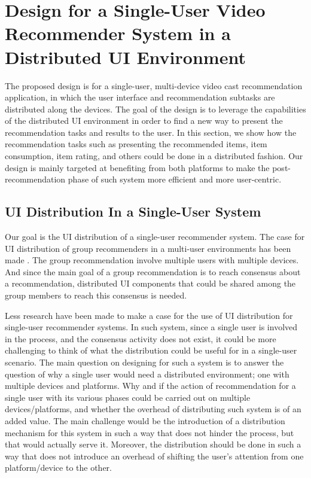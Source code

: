 \section{Design for a Single-User Video Recommender System in a Distributed UI Environment}
The proposed design is for a single-user, multi-device video cast recommendation application, in which the user interface and recommendation subtasks are distributed along the devices. The goal of the design is to leverage the capabilities of the distributed UI environment in order to find a new way to present the recommendation tasks and results to the user. In this section, we show how the recommendation tasks such as presenting the recommended items, item consumption, item rating, and others could be done in a distributed fashion. Our design is mainly targeted at benefiting from both platforms to make the post-recommendation phase of such system more efficient and more user-centric.

\subsection{UI Distribution In a Single-User System}
Our goal is the UI distribution of a single-user recommender system. The case
for UI distribution of group recommenders in a multi-user environments has been
made \cite{worndlvoting}. The group recommendation involve multiple users with
multiple devices.
And since the main goal of a group recommendation is to reach consensus about a recommendation, distributed UI components that could be shared among the group members to reach this consensus is needed.

Less research have been made to make a case for the use of UI distribution for
single-user recommender systems. In such system, since a single user is involved
in the process, and the consensus activity does not exist, it could be more
challenging to think of what the distribution could be useful for in a
single-user scenario. The main question on designing for such a system is to
answer the question of why a single user would need a distributed environment;
one with multiple devices and platforms. Why and if the action of recommendation for a single user with its various phases could be carried out on multiple devices/platforms, and whether the overhead of distributing such system is of an added value. 
The main challenge would be the introduction of a distribution mechanism for
this system in such a way that does not hinder the process, but that would
actually serve it. Moreover, the distribution should be done in such a way that
does not introduce an overhead of shifting the user's attention from one platform/device to the other.

